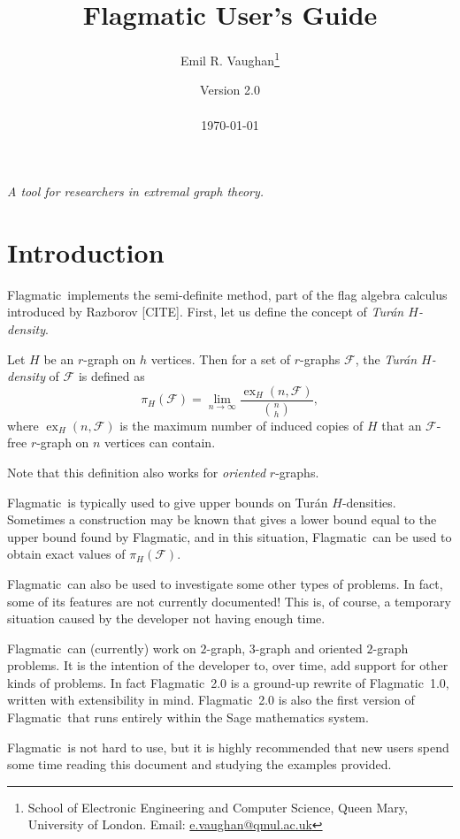 \documentclass{article}
\title{\color{flagcolor} Flagmatic User's Guide}
\author{
Emil R. Vaughan\thanks{School of Electronic Engineering and Computer Science, Queen Mary, University of London. Email: \url{e.vaughan@qmul.ac.uk}} \\
}
\date{Version 2.0 \\ \ \\ \today}
\providecommand{\flagmatic}{Flagmatic}
\DeclareMathOperator{\ex}{ex}
\begin{document}
\maketitle

\begin{center}
\emph{A tool for researchers in extremal graph theory.} 
\end{center}

\section{Introduction} \label{intro}

\flagmatic\ implements the semi-definite method, part of the flag algebra calculus introduced by Razborov [CITE]. First, let us define the concept of \emph{Tur\'an $H$-density}.

Let $H$ be an $r$-graph on $h$ vertices. Then for a set of $r$-graphs $\mathcal{F}$, the \emph{Tur\'an $H$-density} of $\mathcal{F}$ is defined as
\[\pi_{H}(\mathcal{F})= \lim_{n\rightarrow \infty}\frac{\ex_{H}(n, \mathcal{F})}{\binom{n}{h}}, \]
where $\ex_{H}(n, \mathcal{F})$ is the maximum number of induced copies of $H$ that an $\mathcal{F}$-free $r$-graph on $n$ vertices can contain.

Note that this definition also works for \emph{oriented} $r$-graphs.

\flagmatic\ is typically used to give upper bounds on Tur\'an $H$-densities. Sometimes a construction may be known that gives a lower bound equal to the upper bound found by Flagmatic, and in this situation, \flagmatic\ can be used to obtain exact values of $\pi_{H}(\mathcal{F})$. 

\flagmatic\ can also be used to investigate some other types of problems. In fact, some of its features are not currently documented! This is, of course, a temporary situation caused by the developer not having enough time.

\flagmatic\ can (currently) work on $2$-graph, $3$-graph and oriented $2$-graph problems. It is the intention of the developer to, over time, add support for other kinds of problems. In fact \flagmatic\ 2.0 is a ground-up rewrite of \flagmatic\ 1.0, written with extensibility in mind. \flagmatic\ 2.0 is also the first version of \flagmatic\ that runs entirely within the Sage mathematics system.

\flagmatic\ is not hard to use, but it is highly recommended that new users spend some time reading this document and studying the examples provided.
\end{document}
